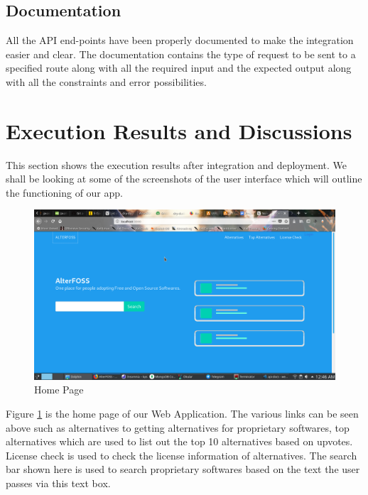 \subsection{Documentation}
All the API end-points have been properly documented to make the integration easier and clear. The documentation contains the type of request to be sent to a specified route along with all the required input and the expected output along with all the constraints and error possibilities.

\pagebreak


\section{Execution Results and Discussions}

This section shows the execution results after integration and deployment. We shall be looking at some of the screenshots of the user interface which will outline the functioning of our app.


\begin{figure}[h!]
\includegraphics[scale=0.45]{images/4-1.png}
\caption{Home Page}
\label{fig:home_page}
\end{figure}


Figure \ref{fig:home_page} is the home page of our Web Application. The various links can be seen above such as alternatives to getting alternatives for proprietary softwares, top alternatives which are used to list out the top 10 alternatives based on upvotes. License check is used to check the license information of alternatives. The search bar shown here is used to search proprietary softwares based on the text the user passes via this text box.


